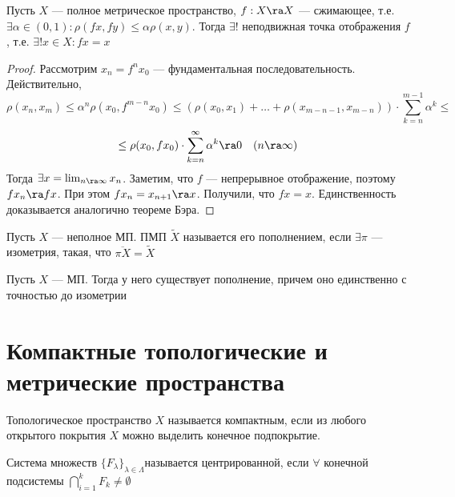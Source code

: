 \begin{theorem}[Банах, 1922]
    Пусть \(X\) --- полное метрическое пространство, \(f: X \ra X\) --- сжимающее, т.е. \(\exists \alpha \in (0, 1): \rho(fx, fy) \le \alpha \rho(x, y)\). Тогда \(\exists! \) неподвижная точка отображения \(f\), т.е. \(\exists! x \in X: fx = x\)
\end{theorem}
\begin{proof}
    Рассмотрим \(x_n = f^nx_0\) --- фундаментальная последовательность. Действительно, 
    \[\rho(x_n, x_m) \le \alpha^n \rho(x_0, f^{m - n}x_0) \le (\rho(x_0, x_1) + \dots + \rho(x_{m - n - 1}, x_{m - n})) \cdot \sum_{k = n}^{m - 1} \alpha^k \le\]
    \[\le \rho(x_0, fx_0) \cdot \sum_{k = n}^\infty \alpha^k \ra 0\quad(n \ra \infty)\]
    Тогда \(\exists x = \lim_{n \ra \infty} x_n\). Заметим, что \(f\) --- непрерывное отображение, поэтому \(fx_n \ra fx\). При этом \(fx_n = x_{n + 1} \ra x\). Получили, что \(fx = x\). Единственность доказывается аналогично теореме Бэра.
\end{proof}

\begin{definition}
    Пусть \(X\) --- неполное МП. ПМП \(\tilde X\) называется его пополнением, если \(\exists \pi\) --- изометрия, такая, что \(\overline{\pi X} = \tilde X\)
\end{definition}

\begin{theorem}[б/д, Хаусдорф]
    Пусть \(X\) --- МП. Тогда у него существует пополнение, причем оно единственно с точностью до изометрии
\end{theorem}


\section{Компактные топологические и метрические пространства}

\begin{definition}
    Топологическое пространство \(X\) называется компактным, если из любого открытого покрытия \(X\) можно выделить конечное подпокрытие.
\end{definition}

\begin{definition}
    Система множеств \(\{F_\lambda\}_{\lambda \in \Lambda}\)называется центрированной, если \(\forall\) конечной подсистемы \(\bigcap_{i = 1}^k F_k \ne \emptyset\)
\end{definition}

